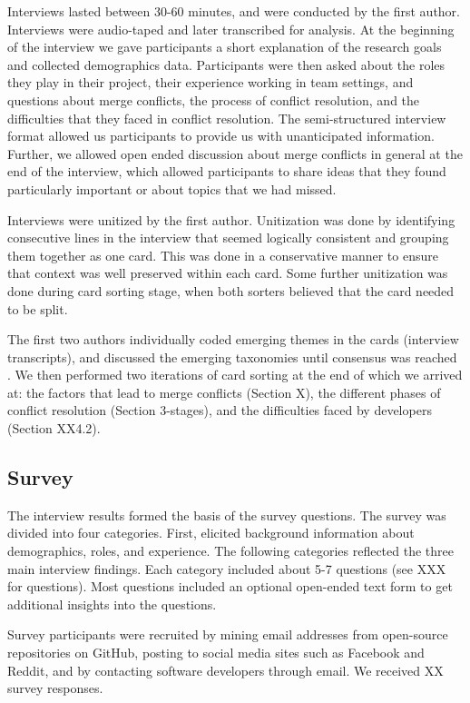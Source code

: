 Interviews lasted between 30-60 minutes, and were conducted by the first author. Interviews were audio-taped and later transcribed for analysis. At the beginning of the interview we gave participants a short explanation of the research goals and collected demographics data. Participants were then asked about the roles they play in their project, their experience working in team settings, and questions about merge conflicts, the process of conflict resolution, and the difficulties that they faced in conflict resolution. The semi-structured interview format allowed us participants to provide us with unanticipated information. Further, we allowed open ended discussion about merge conflicts in general at the end of the interview, which allowed participants to share ideas that they found particularly important or about topics that we had missed. 


Interviews were unitized \cite{unitization} by the first author. Unitization was done by identifying consecutive lines in the interview that seemed logically consistent and grouping them together as one card. This was done in a conservative manner to ensure that context was well preserved within each card. Some further unitization was done during card sorting stage, when both sorters believed that the card needed to be split.


The first two authors individually coded emerging themes in the cards (interview transcripts), and discussed the emerging taxonomies until consensus was reached . We then performed two iterations of card sorting at the end of which we arrived at: the factors that lead to merge conflicts (Section X), the different phases of conflict resolution (Section 3-stages), and the difficulties faced by developers (Section XX4.2).


\subsection{Survey}
The interview results formed the basis of the survey questions. The survey was divided into four categories. First, elicited background information about demographics, roles, and experience. The following categories reflected the three main interview findings. Each category included about 5-7 questions (see XXX for questions). Most questions included an optional open-ended text form to get additional insights into the questions. 

Survey participants were recruited by mining email addresses from open-source repositories on GitHub, posting to social media sites such as Facebook and Reddit, and by contacting software developers through email. We received XX survey responses.